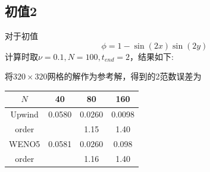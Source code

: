 \documentclass[a4paper,  11pt]{ctexart}
\begin{document}
\subsection{初值2}
对于初值
\[
  \phi = 1-\sin(2x)\sin(2y)
\]
计算时取$\nu=0.1,N=100,t_{end}=2$，结果如下:
\begin{figure}[H]
\end{figure}
将$320\times 320$网格的解作为参考解，得到的2范数误差为
\begin{table}[H]
  \centering
  \begin{tabular}{cccc}
    $N$ & 40 & 80 & 160 \\
    \hline
    Upwind &0.0580&0.0260&0.0098 \\
    order& & 1.15 &1.40 \\
    WENO5 & 0.0581 &0.0260&0.098 \\
    order& & 1.16&1.40 \\
  \end{tabular}
\end{table}
\end{document}
